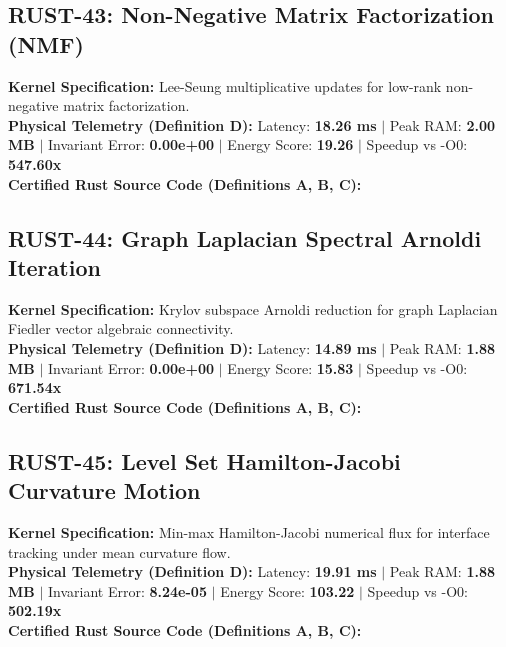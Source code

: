 \vspace{1em}
\subsection{RUST-43: Non-Negative Matrix Factorization (NMF)}
\textbf{Kernel Specification:} Lee-Seung multiplicative updates for low-rank non-negative matrix factorization.\\
\textbf{Physical Telemetry (Definition D):} Latency: \textbf{18.26 ms} $|$ Peak RAM: \textbf{2.00 MB} $|$ Invariant Error: \textbf{0.00e+00} $|$ Energy Score: \textbf{19.26} $|$ Speedup vs -O0: \textbf{547.60x}\\

\textbf{Certified Rust Source Code (Definitions A, B, C):}


\vspace{1em}
\subsection{RUST-44: Graph Laplacian Spectral Arnoldi Iteration}
\textbf{Kernel Specification:} Krylov subspace Arnoldi reduction for graph Laplacian Fiedler vector algebraic connectivity.\\
\textbf{Physical Telemetry (Definition D):} Latency: \textbf{14.89 ms} $|$ Peak RAM: \textbf{1.88 MB} $|$ Invariant Error: \textbf{0.00e+00} $|$ Energy Score: \textbf{15.83} $|$ Speedup vs -O0: \textbf{671.54x}\\

\textbf{Certified Rust Source Code (Definitions A, B, C):}


\vspace{1em}
\subsection{RUST-45: Level Set Hamilton-Jacobi Curvature Motion}
\textbf{Kernel Specification:} Min-max Hamilton-Jacobi numerical flux for interface tracking under mean curvature flow.\\
\textbf{Physical Telemetry (Definition D):} Latency: \textbf{19.91 ms} $|$ Peak RAM: \textbf{1.88 MB} $|$ Invariant Error: \textbf{8.24e-05} $|$ Energy Score: \textbf{103.22} $|$ Speedup vs -O0: \textbf{502.19x}\\

\textbf{Certified Rust Source Code (Definitions A, B, C):}


